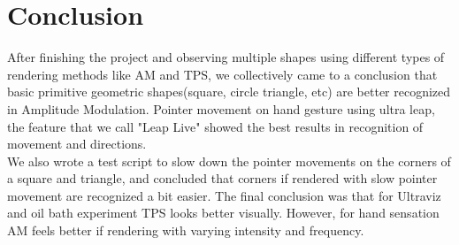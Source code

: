 %

\chapter{Conclusion}
\label{sec:conclusion}
After finishing the project and observing multiple shapes using different types of 
rendering methods like AM and TPS, we collectively came to a conclusion that basic primitive geometric
shapes(square, circle triangle, etc) are better recognized in Amplitude Modulation. 
Pointer movement on hand gesture using ultra leap, the feature that we call "Leap Live" 
showed the best results in recognition of movement and directions. \\[2mm]
We also wrote a test script to slow down the pointer movements on the corners of a square and triangle, 
and concluded that corners if rendered with slow pointer movement are recognized a bit easier. The final 
conclusion was that for Ultraviz and oil bath experiment TPS looks better visually. 
However, for hand sensation AM feels better if rendering with varying intensity and frequency.

